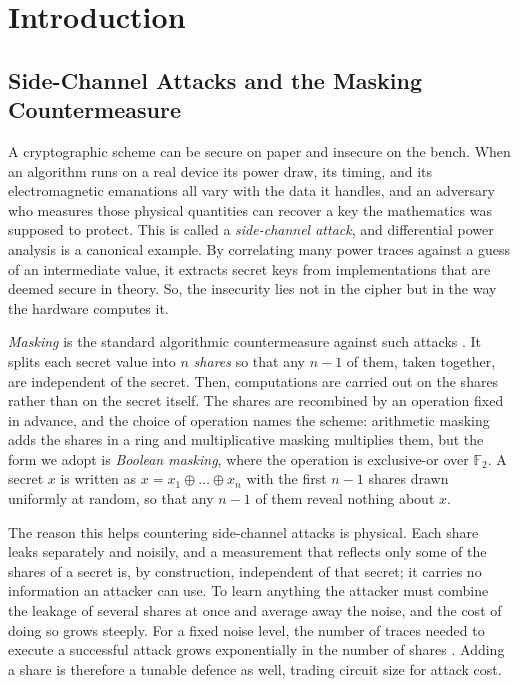 \setlength{\parindent}{0pt}
\chapter{Introduction}
\label{chap:intro}
\section{Side-Channel Attacks and the Masking Countermeasure}
\label{sec:intro-masking}

A cryptographic scheme can be secure on paper and insecure on the bench. When an
algorithm runs on a real device its power draw, its timing, and its
electromagnetic emanations all vary with the data it handles, and an adversary who
measures those physical quantities can recover a key the mathematics was supposed
to protect. This is called a \emph{side-channel attack}, and differential power analysis
\parencite{kocher1999differential} is a canonical example. By correlating many
power traces against a guess of an intermediate value, it extracts secret keys from
implementations that are deemed secure in theory. So, the insecurity
lies not in the cipher but in the way the hardware computes it.

\emph{Masking} is the standard algorithmic countermeasure against such attacks
\parencite{chari1999towards}. It splits each secret value into $n$ \emph{shares} so
that any $n-1$ of them, taken together, are independent of the secret. Then,
computations are carried out on the shares rather than on the secret itself. The
shares are recombined by an operation fixed in advance, and the choice of operation
names the scheme: arithmetic masking adds the shares in a ring and multiplicative
masking multiplies them, but the form we adopt is \emph{Boolean masking}, where the
operation is exclusive-or over $\mathbb{F}_2$. A secret $x$ is written as $x = x_1
\oplus \dots \oplus x_n$ with the first $n-1$ shares drawn uniformly at random, so
that any $n-1$ of them reveal nothing about $x$.

The reason this helps countering side-channel attacks is physical.
Each share leaks separately and noisily, and a
measurement that reflects only some of the shares of a secret is, by construction,
independent of that secret; it carries no information an attacker can use. To learn
anything the attacker must combine the leakage of several shares at once and
average away the noise, and the cost of doing so grows steeply. For a fixed noise
level, the number of traces needed to execute a successful attack grows exponentially
in the number of shares \parencite{chari1999towards}. Adding a share is therefore a
tunable defence as well, trading circuit size for attack cost.


